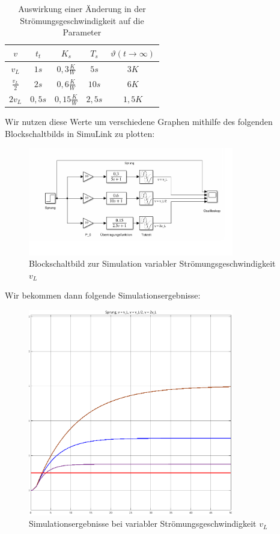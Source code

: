 \documentclass{report}
\begin{document}
\begin{table}[h]
  \centering
  \begin{tabular}{|c||c|c|c|c|}
    \hline
    $v$ & $t_{t}$ & $K_{s}$ & $T_{s}$  & $\vartheta(t\to\infty)$\\
    \hline
    $v_{L}$ & $1s$ & $0,3\frac{K}{W}$ & $5s$ & $3K$ \\
    \hline
    $\frac{v_{L}}{2}$ & $2s$ & $0,6\frac{K}{W}$ & $10s$ & $6K$ \\
    \hline
    $2v_{L}$ & $0,5s$ & $0,15\frac{K}{W}$ & $2,5s$ & $1,5K$\\
    \hline
  \end{tabular}
  \caption{Auswirkung einer Änderung in der Strömungsgeschwindigkeit auf die Parameter}
  \label{tab:speed}
\end{table}
\newpage
Wir nutzen diese Werte um verschiedene Graphen mithilfe des folgenden Blockschaltbilds in SimuLink zu plotten:

\begin{figure}[h]
  \centering
  \includegraphics[width=0.8\textwidth]{../assets/images/RTP/rtp_1_V15.png}
  \caption{Blockschaltbild zur Simulation variabler Strömungsgeschwindigkeit $v_L$}
  \label{fig:vl}
\end{figure}
Wir bekommen dann folgende Simulationsergebnisse:

\begin{figure}[h]
  \centering
  \includegraphics[width=0.8\textwidth]{../assets/images/RTP/rtp_1_V15_2.png}
  \caption{Simulationsergebnisse bei variabler Strömungsgeschwindigkeit $v_{L}$}
  \label{fig:vlplot}
\end{figure}
\end{document}

